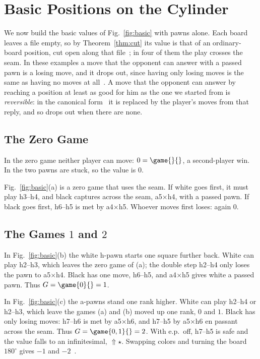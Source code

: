 \section{Basic Positions on the Cylinder}\label{sec:basic}

We now build the basic values of Fig.~\ref{fig:basic} with pawns alone. Each board leaves a file empty, so by
Theorem~\ref{thm:cut} its value is that of an ordinary-board position, cut open along that
file~\cite{Elkies1996,WuYuLandry2010}; in four of them the play crosses the seam. In these examples a move that the
opponent can answer with a passed pawn is a losing move, and it drops out, since having only losing moves is
the same as having no moves at all~\cite{WinningWays,WuYuLandry2010}. A move that the opponent can answer by reaching a
position at least as good for him as the one we started from is \emph{reversible}: in the canonical
form~\cite{WinningWays} it is replaced by the player's moves from that reply, and so drops out when there are
none.

\subsection{The Zero Game}
In the zero game neither player can move: $0=\game{}{}$, a second-player win. In
 the two pawns are stuck, so the value is $0$.

Fig.~\ref{fig:basic}(a) is a zero game that uses the seam. If white goes first, it must play h3--h4, and black
captures across the seam, a5$\times$h4, with a passed pawn. If black goes first, h6--h5 is met by a4$\times$h5.
Whoever moves first loses: again $0$.

\subsection{The Games \texorpdfstring{$1$}{1} and \texorpdfstring{$2$}{2}}
In Fig.~\ref{fig:basic}(b) the white h-pawn starts one square further back. White can play h2--h3, which leaves
the zero game of (a); the double step h2--h4 only loses the pawn to a5$\times$h4. Black has one move, h6--h5,
and a4$\times$h5 gives white a passed pawn. Thus $G=\game{0}{}=1$.

In Fig.~\ref{fig:basic}(c) the a-pawns stand one rank higher. White can play h2--h4 or h2--h3, which leave the
games (a) and (b) moved up one rank, $0$ and $1$. Black has only losing moves: h7--h6 is met by
a5$\times$h6, and h7--h5 by a5$\times$h6 en passant across the seam. Thus $G=\game{0,1}{}=2$. With e.p.\
off, h7--h5 is safe and the value falls to an infinitesimal, ${\Uparrow}\star$. Swapping colors and turning the board $180^\circ$ gives $-1$ and
$-2$~\cite{WuYuLandry2010}.

